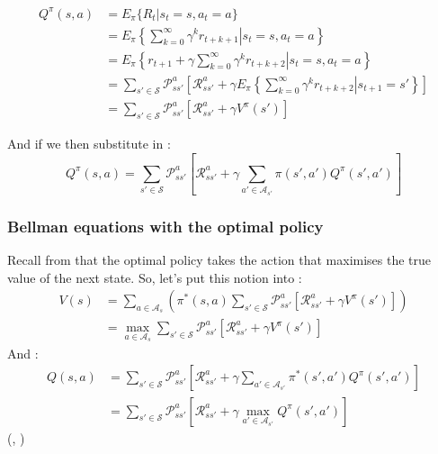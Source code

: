 \begin{equation}
  \begin{split}
    Q^\pi(s, a) & = E_\pi \lbrace R_t | s_t = s, a_t = a \rbrace \\
    & = E_\pi \left\{ \left. \sum_{k=0}^\infty \gamma^kr_{t+k+1} \right| s_t = s, a_t = a \right\} \\
    & = E_\pi \left\{ \left. r_{t+1} + \gamma\sum_{k=0}^\infty \gamma^kr_{t+k+2} \right| s_t = s, a_t = a \right\} \\
    & = \sum_{s' \in \mathcal{S}}\mathcal{P}^a_{ss'} \left[\mathcal{R}^a_{ss'} +
      \gamma E_\pi \left\{ \left. \sum_{k=0}^\infty \gamma^kr_{t+k+2} \right| s_{t+1}
        = s' \right\} \right] \\
    & = \sum_{s' \in \mathcal{S}}\mathcal{P}^a_{ss'}
    \left[\mathcal{R}^a_{ss'} + \gamma V^\pi(s') \right]
  \end{split}
\end{equation}

\citep[Section~3.7]{sutton1998introduction}

And if we then substitute in :
\begin{equation}
  Q^\pi(s, a) = \sum_{s' \in \mathcal{S}}\mathcal{P}^a_{ss'}
    \left[\mathcal{R}^a_{ss'} + \gamma \sum_{a'\in\mathcal{A}_{s'}}\pi(s', a')Q^\pi(s', a') \right]
    \label{eq:bellman-q}
\end{equation}


\subsubsection{Bellman equations with the optimal policy}
Recall from  that the optimal policy takes
the action that maximises the true value of the next state. So, let's put this
notion into :
\begin{equation}
  \begin{split}
  V(s) &= \sum_{a\in\mathcal{A}_s} \left( \pi^*(s, a)
    \sum_{s' \in \mathcal{S}}\mathcal{P}^a_{ss'}
    \left[\mathcal{R}^a_{ss'} + \gamma V^\pi(s') \right] \right) \\
  &= \max_{a\in\mathcal{A}_s}\sum_{s' \in \mathcal{S}}\mathcal{P}^a_{ss'}
\left[\mathcal{R}^a_{ss'} + \gamma V^\pi(s') \right]
  \end{split}
\label{eq:bellman-v-optimal}
\end{equation}
And :
\begin{equation}
  \begin{split}
  Q(s, a) &= \sum_{s' \in \mathcal{S}}\mathcal{P}^a_{ss'}
    \left[\mathcal{R}^a_{ss'} + \gamma \sum_{a'\in\mathcal{A}_{s'}}\pi^*(s', a')Q^\pi(s', a') \right] \\
  &= \sum_{s' \in \mathcal{S}}\mathcal{P}^a_{ss'}
    \left[\mathcal{R}^a_{ss'} + \gamma \max_{a'\in\mathcal{A}_{s'}}Q^\pi(s', a') \right]
  \end{split}
\label{eq:bellman-q-optimal}
  \end{equation}
(\cite[Section~17.2.1]{russell2009aima}, \cite[Section~3.8]{sutton1998introduction})

